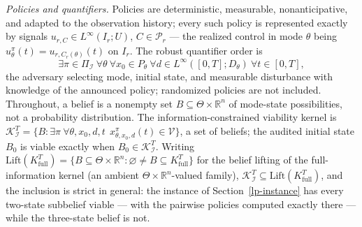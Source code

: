 \documentclass[10pt,twocolumn]{article}
\theoremstyle{plain}
\theoremstyle{definition}
\theoremstyle{remark}
\begin{document}
\emph{Policies and quantifiers.} Policies are deterministic, measurable,
nonanticipative, and adapted to the observation history; every such policy is
represented exactly by signals \(u_{r,C} \in L^\infty(I_r; U)\),
\(C \in \mathcal{P}_r\) --- the realized control in mode \(\theta\) being
\(u^{\pi}_\theta(t) = u_{r, C_r(\theta)}(t)\) on \(I_r\). The robust quantifier order is
\[
\exists \pi \in \Pi_{\mathcal{I}}\ \forall \theta\ \forall x_0 \in P_\theta\
\forall d \in L^\infty([0,T]; D_\theta)\ \forall t \in [0,T],
\]
the adversary selecting mode, initial state, and measurable disturbance with
knowledge of the announced policy; randomized policies are not included. Throughout, a belief is a nonempty set \(B \subseteq \Theta \times
\mathbb{R}^n\) of mode-state possibilities, not a probability
distribution. The information-constrained viability kernel is
\(\mathcal{K}_{\mathcal{I}}^T = \{ B : \exists \pi\ \forall \theta, x_0,
d, t\ \ x^{\pi}_{\theta, x_0, d}(t) \in \mathcal{V} \}\), a set of
beliefs; the audited initial state \(B_0\) is viable exactly when
\(B_0 \in \mathcal{K}_{\mathcal{I}}^T\). Writing
\(\mathrm{Lift}(K^T_{\mathrm{full}}) = \{ B \subseteq \Theta \times
\mathbb{R}^n : \varnothing \ne B \subseteq K^T_{\mathrm{full}} \}\) for
the belief lifting of the full-information kernel (an ambient
\(\Theta \times \mathbb{R}^n\)-valued family), \(\mathcal{K}_{\mathcal{I}}^T \subseteq
\mathrm{Lift}(K^T_{\mathrm{full}})\), and the inclusion is strict in general:
the instance of Section~\ref{lp-instance} has every two-state subbelief
viable --- with the pairwise policies computed exactly there --- while the
three-state belief is not.
\end{document}
